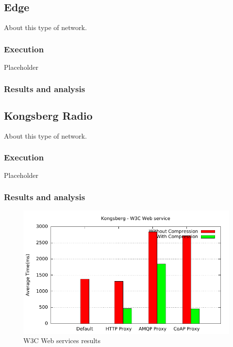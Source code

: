 \subsection{Edge}

About this type of network.

\subsubsection{Execution}
Placeholder

\subsubsection{Results and analysis}

\subsection{Kongsberg Radio}

About this type of network.

\subsubsection{Execution}
Placeholder

\subsubsection{Results and analysis}

\begin{figure}[H]
\center
\includegraphics[scale=0.75]{../results/kongsberg/nffi/out.pdf}
\caption{W3C Web services results}
\end{figure}

